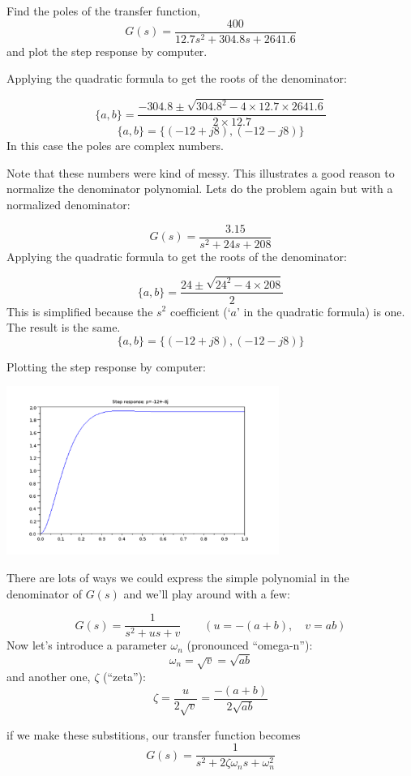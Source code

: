 \begin{ExampleSmall}
Find the poles of the transfer function,
\[
G(s) = \frac{400}{12.7s^2 + 304.8s + 2641.6}
\]
and plot the step response by computer.

\vspace{0.25in}
Applying the quadratic formula to get the roots of the denominator:

\[
\{a,b\} = \frac {-304.8 \pm \sqrt{304.8^2 -4\times12.7\times2641.6}}{2\times 12.7}
\]
\[
\{a,b\} = \{(-12+j8),(-12-j8)\}
\]
In this case the poles are complex numbers.

Note that these numbers were kind of messy. This illustrates a good reason to normalize the denominator polynomial.   Lets do the problem again but with a normalized denominator:

\[
G(s) = \frac{3.15}{s^2 + 24s + 208}
\]
Applying the quadratic formula to get the roots of the denominator:

\[
\{a,b\} = \frac {24 \pm \sqrt{24^2 -4\times208}}{2}
\]
This is simplified because the $s^2$ coefficient (`$a$' in the quadratic formula) is one.  The result is the same.
\[
\{a,b\} = \{(-12+j8),(-12-j8)\}
\]

Plotting the step response by computer:

\includegraphics[width=3.5in]{figs05/cplxstepa.png}
\end{ExampleSmall}


There are lots of ways we could express the simple polynomial in the denominator of $G(s)$ and we'll play around with a few:

\[
G(s) = \frac{1}{s^2+us+v} \qquad (u = -(a+b),\quad v= ab)
\]
Now let's introduce a parameter $\omega_n$ (pronounced ``omega-n''):
\[
\omega_n  = \sqrt{v} = \sqrt{ab}
\]
and another one, $\zeta$ (``zeta''):
\[
\zeta = \frac{u}{2\sqrt{v}} = \frac{-(a+b)}{2\sqrt{ab}}
\]

if we make these substitions, our transfer function becomes
\[
G(s) = \frac{1}{s^2 + 2\zeta\omega_n s+\omega_n^2}
\]

